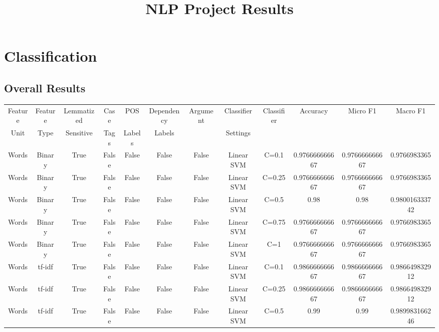 \documentclass[11pt]{article}
\newcommand{\headcol}{\rowcolor{tableheadcolor}} %
\begin{document}
  \title{NLP Project Results}

  \maketitle
 
 \section{Classification}
\subsection{Overall Results}
    
  \begin{tabular}{|c|c|c|c|c|c|c|c|c|c|c|c|}
  \hline
  \headcol \color{white}  Feature  & \color{white}  Feature  &  \color{white}  Lemmatized & \color{white}  Case  & \color{white}   POS  & \color{white}   Dependency  &  \color{white}  Argument  &  \color{white}  Classifier &  \color{white}  Classifier  & \color{white}  Accuracy & \color{white}  Micro F1 & \color{white}  Macro F1 \\
\headcol  \color{white}  Unit &  \color{white}  Type & \color{white}  Sensitive &  \color{white} Tags &  \color{white} Labels &  \color{white} Labels & & \color{white} Settings & & & &  \\
  \hline
  Words & Binary & True & False & False & False & False & Linear SVM & C=0.1 & 0.976666666667 & 0.976666666667 & 0.9766983365 \\ 
Words & Binary & True & False & False & False & False & Linear SVM & C=0.25 & 0.976666666667 & 0.976666666667 & 0.9766983365 \\ 
Words & Binary & True & False & False & False & False & Linear SVM & C=0.5 & 0.98 & 0.98 & 0.980016333742 \\ 
Words & Binary & True & False & False & False & False & Linear SVM & C=0.75 & 0.976666666667 & 0.976666666667 & 0.9766983365 \\ 
Words & Binary & True & False & False & False & False & Linear SVM & C=1 & 0.976666666667 & 0.976666666667 & 0.9766983365 \\ 
Words & tf-idf & True & False & False & False & False & Linear SVM & C=0.1 & 0.986666666667 & 0.986666666667 & 0.986649832912 \\ 
Words & tf-idf & True & False & False & False & False & Linear SVM & C=0.25 & 0.986666666667 & 0.986666666667 & 0.986649832912 \\ 
Words & tf-idf & True & False & False & False & False & Linear SVM & C=0.5 & 0.99 & 0.99 & 0.989983166246 \\ 

\end{tabular}
\end{document}
